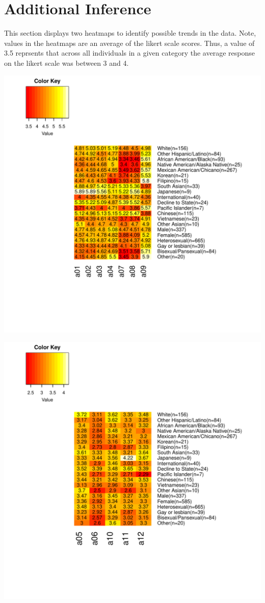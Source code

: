 \documentclass{article}\usepackage[]{graphicx}\usepackage[]{color}
\makeatletter
\def\maxwidth{ %
  \ifdim\Gin@nat@width>\linewidth
    \linewidth
  \else
    \Gin@nat@width
  \fi
}
\makeatother
\begin{document}
\pagebreak
\section{Additional Inference}
This section displays two heatmaps to identify possible trends in the data. Note, values in the heatmaps are an average of the likert scale scores. Thus, a value of 3.5 reprsents that across all individuals in a given category the average response on the likert scale was between 3 and 4.  



\includegraphics[width=\maxwidth]{figure/unnamed-chunk-18-1} \hfill{}




\includegraphics[width=\maxwidth]{figure/unnamed-chunk-18-2} \hfill{}
\end{document}
